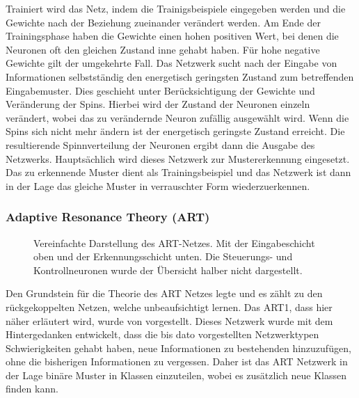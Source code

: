 Trainiert wird das Netz, indem die Trainigsbeispiele eingegeben werden und die Gewichte nach der Beziehung zueinander verändert werden. Am Ende der Trainingsphase haben die Gewichte einen hohen positiven Wert, bei denen die Neuronen oft den gleichen Zustand inne gehabt haben. Für hohe negative Gewichte gilt der umgekehrte Fall. Das Netzwerk sucht nach der Eingabe von Informationen selbstständig den energetisch geringsten Zustand zum betreffenden Eingabemuster. Dies geschieht unter Berücksichtigung der Gewichte und Veränderung der Spins. Hierbei wird der Zustand der Neuronen einzeln verändert, wobei das zu verändernde Neuron zufällig ausgewählt wird. Wenn die Spins sich nicht mehr ändern ist der energetisch geringste Zustand erreicht. Die resultierende Spinnverteilung der Neuronen ergibt dann die Ausgabe des Netzwerks. Hauptsächlich wird dieses Netzwerk zur Mustererkennung eingesetzt. Das zu erkennende Muster dient als Trainingsbeispiel und das Netzwerk ist dann in der Lage das gleiche Muster in verrauschter Form wiederzuerkennen.


\subsubsection{Adaptive Resonance Theory (ART)}%
\begin{figure}[!htb]
    \centering
        
    \caption[Darstellung eines ART]{Vereinfachte Darstellung des ART-Netzes. Mit der Eingabeschicht oben und der Erkennungsschicht unten. Die Steuerungs- und Kontrollneuronen wurde der Übersicht halber nicht dargestellt.\,\protect\footnotemark{}}
    \label{fig:ART}
\end{figure}
\addtocounter{footnote}{-1}     %
\addtocounter{Hfootnote}{-1}    %
\wrapfigfoot{}
Den Grundstein für die Theorie des \gls{ART} Netzes legte \citet{Grossberg1973} und es zählt zu den rückgekoppelten Netzen, welche unbeaufsichtigt lernen. Das ART1, dass hier näher erläutert wird, wurde von \citet{Carpenter1987} vorgestellt. Dieses Netzwerk wurde mit dem Hintergedanken entwickelt, dass die bis dato vorgestellten Netzwerktypen Schwierigkeiten gehabt haben, neue Informationen zu bestehenden hinzuzufügen, ohne die bisherigen Informationen zu \glqq vergessen\grqq . Daher ist das ART Netzwerk in der Lage binäre Muster in Klassen einzuteilen, wobei es zusätzlich neue Klassen finden kann. 

